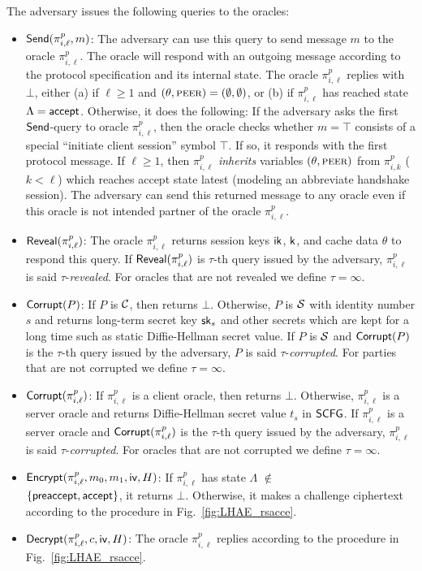 The adversary issues the following queries to the
oracles:
\begin{itemize}
 \item {$\mathsf{Send}(\pi^p_{i, \ell}, m)$:
 The adversary can use this query to send message
 $m$ to the oracle $\pi^p_{i, \ell}$.
 The oracle will respond with an outgoing message
 according to the protocol specification and its
 internal state.
 The oracle $\pi^p_{i, \ell}$ replies with $\bot$,
 either (a) if $\ell \geq 1$ and
 $(\theta,\textsc{peer}) = (\emptyset, \emptyset)$, or (b)
 if $\pi^p_{i,\ell}$ has reached state
 $\Lambda = \mathsf{accept}$.
 Otherwise, it does the following: If the adversary
 asks the first $\mathsf{Send}$-query to oracle
 $\pi^p_{i, \ell}$, then the oracle checks whether
 $m = \top$ consists of a special
 ``initiate client session'' symbol $\top$.
 If so, it responds with the first protocol message.
 If $\ell \geq 1$,
 then $\pi^p_{i,\ell}$ \textit{inherits} variables $(\theta,\textsc{peer})$ from
 $\pi^p_{i, k}$ ($k < \ell$) which reaches accept state latest
 (modeling an abbreviate handshake session).
 The adversary can send this returned message to any
 oracle even if this oracle is not intended partner of
 the oracle $\pi^p_{i, \ell}$.}

 \item {$\mathsf{Reveal}(\pi^p_{i,\ell})$:
 The oracle $\pi^p_{i,\ell}$ returns session keys
 $\mathsf{ik}$, $\mathsf{k}$, and cache data $\theta$ to respond this query.
 If $\mathsf{Reveal}(\pi^p_{i,\ell})$ is $\tau$-th query issued by the adversary,
 $\pi^p_{i,\ell}$ is said $\tau$-\textit{revealed}.
 For oracles that are not revealed we define
 $\tau = \infty$.}

 \item {$\mathsf{Corrupt}(P)$:
 If $P$ is $\mathcal{C}$, then returns $\bot$.
 Otherwise, $P$ is $\mathcal{S}$ with identity number $s$ and returns long-term
 secret key $\mathsf{sk}_s$ and other secrets which are kept
 for a long time such as static Diffie-Hellman secret
 value.
 If $P$ is $\mathcal{S}$ and $\mathsf{Corrupt}(P)$ is the
 $\tau$-th query issued by the adversary, $P$ is said
 $\tau$-\textit{corrupted}.
 For parties that are not corrupted we define
 $\tau = \infty$.}

\item {$\mathsf{Corrupt}(\pi^p_{i,\ell})$:
 If $\pi^p_{i,\ell}$ is a client oracle, then returns $\bot$.
 Otherwise, $\pi^p_{i,\ell}$ is a server oracle and returns
 Diffie-Hellman secret value $t_s$ in $\mathsf{SCFG}$.
 If $\pi^p_{i,\ell}$ is a server oracle and $\mathsf{Corrupt}(\pi^p_{i,\ell})$ is the
 $\tau$-th query issued by the adversary, $\pi^p_{i,\ell}$ is said
 $\tau$-\textit{corrupted}.
 For oracles that are not corrupted we define
 $\tau = \infty$.}

 \item {$\mathsf{Encrypt}(\pi^p_{i,\ell}, m_0, m_1, \mathsf{iv}, H)$:
 If $\pi^p_{i,\ell}$ has state
 $\Lambda$ $\not\in$ \\ $\{\mathsf{preaccept}, \mathsf{accept}\}$,
 it returns $\bot$.
 Otherwise, it makes a challenge ciphertext according to
 the procedure in Fig.~\ref{fig:LHAE_rsacce}.}

 \item {$\mathsf{Decrypt}(\pi^p_{i, \ell}, c, \mathsf{iv}, H)$:
 The oracle $\pi^p_{i, \ell}$ replies according to the
 procedure in Fig.~\ref{fig:LHAE_rsacce}.}
\end{itemize}

